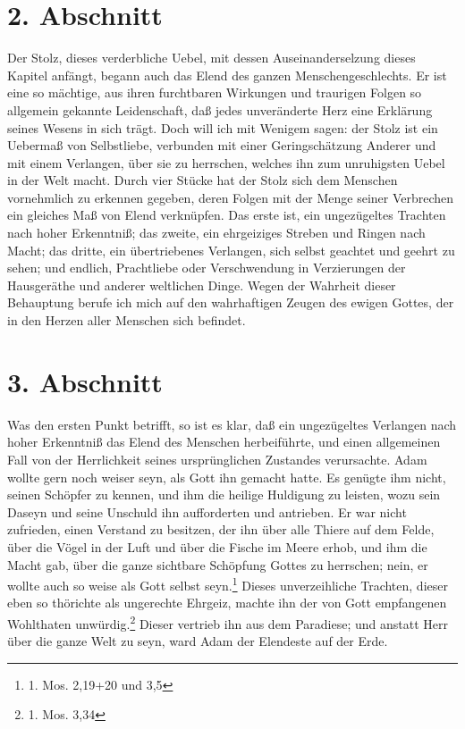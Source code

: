 \section{2. Abschnitt}

Der Stolz, dieses verderbliche Uebel, mit dessen Auseinanderselzung dieses
Kapitel anfängt, begann auch das Elend des ganzen Menschengeschlechts. Er ist
eine so mächtige, aus ihren furchtbaren Wirkungen und traurigen Folgen so
allgemein gekannte Leidenschaft, daß jedes unveränderte Herz eine Erklärung
seines Wesens in sich trägt. Doch will ich mit Wenigem sagen: der Stolz ist ein
Uebermaß von Selbstliebe, verbunden mit einer Geringschätzung Anderer und mit
einem Verlangen, über sie zu herrschen, welches ihn zum unruhigsten Uebel in der
Welt macht. Durch vier Stücke hat der Stolz sich dem Menschen vornehmlich zu
erkennen gegeben, deren Folgen mit der Menge seiner Verbrechen ein gleiches Maß
von Elend verknüpfen. Das erste ist, ein ungezügeltes Trachten nach hoher
Erkenntniß; das zweite, ein ehrgeiziges Streben und Ringen nach Macht; das
dritte, ein übertriebenes Verlangen, sich selbst geachtet und geehrt zu sehen;
und endlich, Prachtliebe oder Verschwendung in Verzierungen der Hausgeräthe und
anderer weltlichen Dinge. Wegen der Wahrheit dieser Behauptung berufe ich mich
auf den wahrhaftigen Zeugen des ewigen Gottes, der in den Herzen aller Menschen
sich befindet.

\section{3. Abschnitt}

Was den ersten Punkt betrifft, so ist es klar, daß ein ungezügeltes Verlangen
nach hoher Erkenntniß das Elend des Menschen herbeiführte, und einen allgemeinen
Fall von der Herrlichkeit seines ursprünglichen Zustandes verursachte. Adam
wollte gern noch weiser seyn, als Gott ihn gemacht hatte. Es genügte ihm nicht,
seinen Schöpfer zu kennen, und ihm die heilige Huldigung zu leisten, wozu sein
Daseyn und seine Unschuld ihn aufforderten und antrieben. Er war nicht
zufrieden, einen Verstand zu besitzen, der ihn über alle Thiere auf dem Felde,
über die Vögel in der Luft und über die Fische im Meere erhob, und ihm die Macht
gab, über die ganze sichtbare Schöpfung Gottes zu herrschen; nein, er wollte
auch so weise als Gott selbst seyn.\footnote{1. Mos. 2,19+20 und 3,5} Dieses
unverzeihliche Trachten, dieser eben so thörichte als ungerechte Ehrgeiz, machte
ihn der von Gott empfangenen Wohlthaten unwürdig.\footnote{1. Mos. 3,34} Dieser
vertrieb ihn aus dem Paradiese; und anstatt Herr über die ganze Welt zu seyn,
ward Adam der Elendeste auf der Erde.

